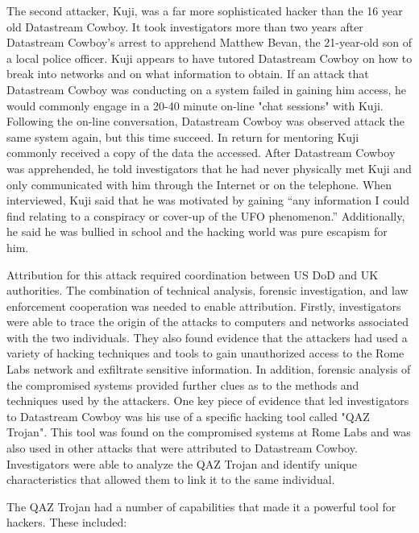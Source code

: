 \documentclass[12pt]{report}
\begin{document}
The second attacker, Kuji, was a far more sophisticated hacker than the 16 year old Datastream Cowboy.  It took investigators more than two years after Datastream Cowboy’s arrest to apprehend Matthew Bevan, the 21-year-old son of a local police officer.  Kuji appears to have tutored Datastream Cowboy on how to break into networks and on what information to obtain.  If an attack that Datastream Cowboy was conducting on a system failed in gaining him access, he would commonly engage in a 20-40 minute on-line "chat sessions" with Kuji.  Following the on-line conversation, Datastream Cowboy was observed attack the same system again, but this time succeed.  In return for mentoring Kuji commonly received a copy of the data the accessed.  After Datastream Cowboy was apprehended, he told investigators that he had never physically met Kuji and only communicated with him through the Internet or on the telephone.  When interviewed, Kuji said that he was motivated by gaining “any information I could find relating to a conspiracy or cover-up of the UFO phenomenon.”  Additionally, he said he was bullied in school and the hacking world was pure escapism for him.  

Attribution for this attack required coordination between US DoD and UK authorities.  The combination of technical analysis, forensic investigation, and law enforcement cooperation was needed to enable attribution.  Firstly, investigators were able to trace the origin of the attacks to computers and networks associated with the two individuals. They also found evidence that the attackers had used a variety of hacking techniques and tools to gain unauthorized access to the Rome Labs network and exfiltrate sensitive information.  In addition, forensic analysis of the compromised systems provided further clues as to the methods and techniques used by the attackers.  One key piece of evidence that led investigators to Datastream Cowboy was his use of a specific hacking tool called "QAZ Trojan". This tool was found on the compromised systems at Rome Labs and was also used in other attacks that were attributed to Datastream Cowboy. Investigators were able to analyze the QAZ Trojan and identify unique characteristics that allowed them to link it to the same individual.

The QAZ Trojan had a number of capabilities that made it a powerful tool for hackers. These included:
\end{document}
